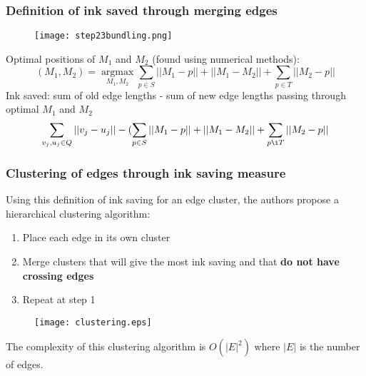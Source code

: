 \documentclass[12pt]{beamer}
\begin{document}
\begin{frame}
	\frametitle{Definition of ink saved through merging edges}
	
	\begin{figure}
		\texttt{[image: step23bundling.png]}
	\end{figure}
	
	\footnotesize {
	Optimal positions of $M_1$ and $M_2$ (found using numerical methods):
	\begin{equation}
		(M_1, M_2) = \underset{M_{1},M_{2}}{\operatorname{argmax}}\sum\limits_{p \in S}||M_1 - p|| + ||M_1 - M_2|| + \sum\limits_{p \in T} ||M_2 - p||
	\end{equation}
	}
	\footnotesize {
	Ink saved: sum of old edge lengths - sum of new edge lengths passing through optimal $M_1$ and $M_2$
	\begin{equation}
		\sum\limits_{v_j,u_j \in Q}||v_j -u_j|| - (\sum\limits_{p \in S}||M_1 - p|| + ||M_1 - M_2|| + \sum\limits_{p \i T}||M_2 - p||
	\end{equation}
	}
\end{frame}

\begin{frame}
	\frametitle{Clustering of edges through ink saving measure}
	Using this definition of ink saving for an edge cluster, the authors propose a hierarchical clustering algorithm:
	\begin{enumerate}
		\item Place each edge in its own cluster
		\item Merge clusters that will give the most ink saving and that \textbf{do not have crossing edges}
		\item Repeat at step 1
	\end{enumerate}
	\begin{figure}
		\texttt{[image: clustering.eps]}
	\end{figure}
	The complexity of this clustering algorithm is $O(|E|^2)$ where $|E|$ is the number of edges.
\end{frame}
\end{document}
